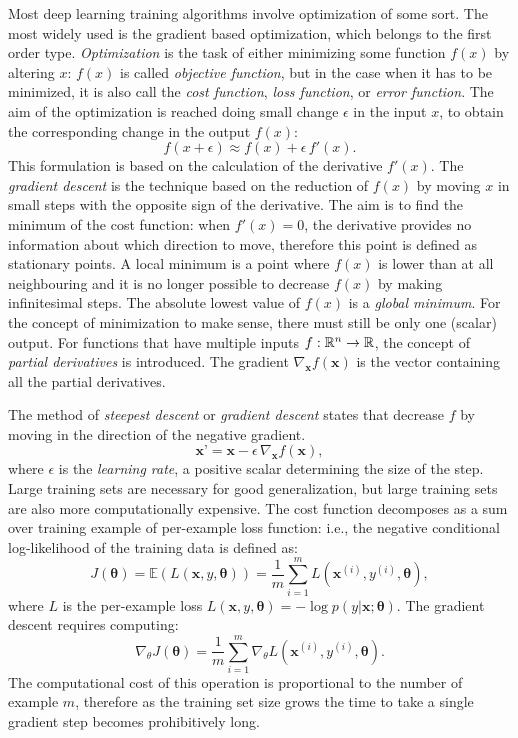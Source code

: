Most deep learning training algorithms involve optimization of some sort.
The most widely used is the gradient based optimization, which belongs to the first order type.
\textit{Optimization} is the task of either minimizing some function $f(x)$ by altering $x$:
$f(x)$ is called \textit{objective function}, but in the case when it has to be minimized, it is also call the \textit{cost function}, \textit{loss function}, or \textit{error function}.
The aim of the optimization is reached doing small change $\epsilon$ in the input $x$, to obtain the corresponding change in the output $f(x)$:
\begin{equation}
f(x+\epsilon) \approx f(x)+\epsilon\,f'(x).
\end{equation}
This formulation is based on the calculation of the derivative $f'(x)$.
The \textit{gradient descent} is the technique based on the reduction of $f(x)$ by moving $x$ in small steps with the opposite sign of the derivative.
The aim is to find the minimum of the cost function: when $f'(x)=0$, the derivative provides no information about which direction to move, therefore this point is defined as stationary points.
A local minimum is a point where $f(x)$ is lower than at all neighbouring and it is no longer possible to decrease $f(x)$ by making infinitesimal steps.
The absolute lowest value of $f(x)$ is a \textit{global minimum}.
For the concept of minimization to make sense, there must still be only one (scalar) output.
For functions that have multiple inputs $f: {\mathbb{R}}^n \rightarrow {\mathbb{R}}$, the concept of \textit{partial derivatives} is introduced.
The gradient $\nabla_{\mathbf{x}}f(\mathbf{x})$ is the vector containing all the partial derivatives.


The method of \textit{steepest descent} or \textit{gradient descent} states that decrease $f$ by moving in the direction of the negative gradient.
\begin{equation}
\textbf{x'} = \textbf{x} - \epsilon\,\nabla_{\mathbf{x}}f(\mathbf{x}),
\end{equation}
where $\epsilon$ is the \textit{learning rate}, a positive scalar determining the size of the step.
Large training sets are necessary for good generalization, but large training sets are also more computationally expensive.
The cost function decomposes as a sum over training example of per-example loss function:
i.e., the negative conditional log-likelihood of the training data is defined as:
\begin{equation}
J(\mathbf{\theta}) = \mathbb{E}(L(\textbf{x}, y, \mathbf{\theta})) = \frac{1}{m} \sum\limits_{i=1}^{m} L(\textbf{x}^{(i)}, y^{(i)}, \mathbf{\theta}),
\end{equation}
where $L$ is the per-example loss $L(\textbf{x}, y, \mathbf{\theta}) = - \log p(y|\textbf{x};\mathbf{\theta})$.
The gradient descent requires computing:
\begin{equation}
\nabla_{\theta} J(\mathbf{\theta}) = \frac{1}{m} \sum\limits_{i=1}^{m} \nabla_{\theta} L(\textbf{x}^{(i)}, y^{(i)}, \mathbf{\theta}).
\end{equation}
The computational cost of this operation is proportional to the number of example $m$, therefore as the training set size grows the time to take a single gradient step becomes prohibitively long.


